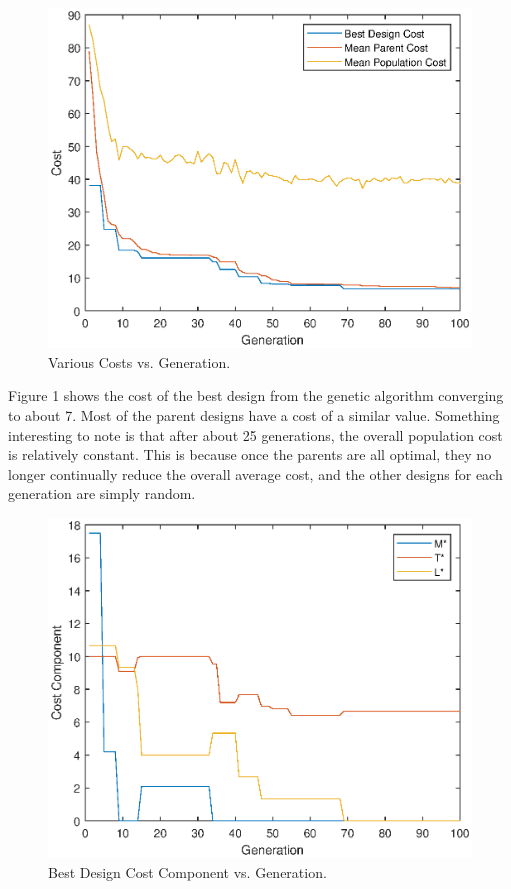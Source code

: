 \documentclass[a4paper,12pt]{report}
\begin{document}
\begin{figure}[H]
  \includegraphics[width=\linewidth]{results1.eps}
  \caption{Various Costs vs. Generation.}
\end{figure}

Figure 1 shows the cost of the best design from the genetic algorithm converging to about 7. Most of the parent designs have a cost of a similar value. Something interesting to note is that after about 25 generations, the overall population cost is relatively constant. This is because once the parents are all optimal, they no longer continually reduce the overall average cost, and the other designs for each generation are simply random.

\begin{figure}[H]
  \includegraphics[width=\linewidth]{results2a.eps}
  \caption{Best Design Cost Component vs. Generation.}
\end{figure}
\end{document}
